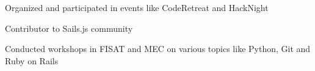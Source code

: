 \begin{cventries}
  \cventry
    {}
    {}
    {}
    {}
    {
      \begin{cvitems}
        \item {Organized and participated in events like CodeRetreat and HackNight}
        \item {Contributor to  Sails.js community}
        \item {Conducted workshops in FISAT and MEC on various topics like Python, Git and Ruby on Rails}
      \end{cvitems}
    }
\end{cventries}
